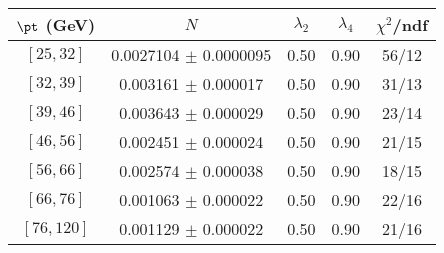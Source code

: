 \begin{tabular}{c||c|c|c|c}
$\pt$ (GeV) & $N$ & $\lambda_{2}$ & $\lambda_4$  & $\chi^2$/ndf  \\
\hline
$[25, 32]$ & 0.0027104 $\pm$ 0.0000095 & 0.50 & 0.90 & 56/12\\
$[32, 39]$ & 0.003161 $\pm$ 0.000017 & 0.50 & 0.90 & 31/13\\
$[39, 46]$ & 0.003643 $\pm$ 0.000029 & 0.50 & 0.90 & 23/14\\
$[46, 56]$ & 0.002451 $\pm$ 0.000024 & 0.50 & 0.90 & 21/15\\
$[56, 66]$ & 0.002574 $\pm$ 0.000038 & 0.50 & 0.90 & 18/15\\
$[66, 76]$ & 0.001063 $\pm$ 0.000022 & 0.50 & 0.90 & 22/16\\
$[76, 120]$ & 0.001129 $\pm$ 0.000022 & 0.50 & 0.90 & 21/16\\
\end{tabular}

